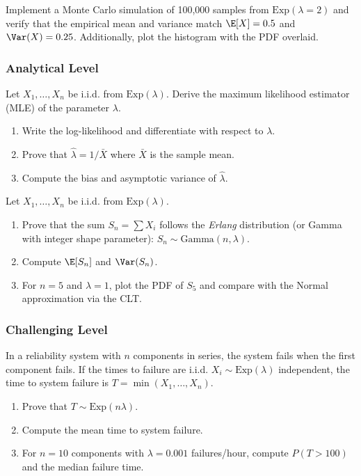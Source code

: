 \begin{problema}
	\label{prob:4.5.6}
	Implement a Monte Carlo simulation of 100{,}000 samples from $\text{Exp}(\lambda = 2)$ and verify that the empirical mean and variance match $\E[X] = 0.5$ and $\Var(X) = 0.25$. Additionally, plot the histogram with the PDF overlaid.
\end{problema}

\subsubsection*{Analytical Level}

\begin{problema}
	\label{prob:4.5.7}
	Let $X_{1}, \dots, X_{n}$ be i.i.d. from $\text{Exp}(\lambda)$. Derive the maximum likelihood estimator (MLE) of the parameter $\lambda$.
	\begin{enumerate}
		\item Write the log-likelihood and differentiate with respect to $\lambda$.
		\item Prove that $\hat{\lambda} = 1/\bar{X}$ where $\bar{X}$ is the sample mean.
		\item Compute the bias and asymptotic variance of $\hat{\lambda}$.
	\end{enumerate}
\end{problema}

\begin{problema}
	\label{prob:4.5.8}
	Let $X_{1}, \dots, X_{n}$ be i.i.d. from $\text{Exp}(\lambda)$.
	\begin{enumerate}
		\item Prove that the sum $S_{n} = \sum X_{i}$ follows the \emph{Erlang} distribution (or Gamma with integer shape parameter): $S_{n} \sim \text{Gamma}(n, \lambda)$.
		\item Compute $\E[S_{n}]$ and $\Var(S_{n})$.
		\item For $n = 5$ and $\lambda = 1$, plot the PDF of $S_{5}$ and compare with the Normal approximation via the CLT.
	\end{enumerate}
\end{problema}

\subsubsection*{Challenging Level}

\begin{problema}
	\label{prob:4.5.9}
	In a reliability system with $n$ components in series, the system fails when the first component fails. If the times to failure are i.i.d. $X_{i} \sim \text{Exp}(\lambda)$ independent, the time to system failure is $T = \min(X_{1}, \dots, X_{n})$.
	\begin{enumerate}
		\item Prove that $T \sim \text{Exp}(n\lambda)$.
		\item Compute the mean time to system failure.
		\item For $n = 10$ components with $\lambda = 0.001$ failures/hour, compute $P(T > 100)$ and the median failure time.
	\end{enumerate}
\end{problema}

